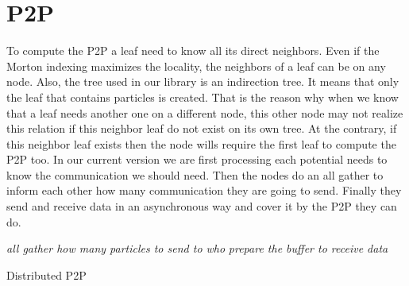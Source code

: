 \documentclass[12pt,letterpaper,titlepage]{report}
\begin{document}
\section{P2P}
To compute the P2P a leaf need to know all its direct neighbors.
Even if the Morton indexing maximizes the locality, the neighbors of a leaf can be on any node.
Also, the tree used in our library is an indirection tree.
It means that only the leaf that contains particles is created.
That is the reason why when we know that a leaf needs another one on a different node, this other node may not realize this relation if this neighbor leaf do not exist on its own tree.
At the contrary, if this neighbor leaf exists then the node wills require the first leaf to compute the P2P too.
In our current version we are first processing each potential needs to know the communication we should need.
Then the nodes do an all gather to inform each other how many communication they are going to send.
Finally they send and receive data in an asynchronous way and cover it by the P2P they can do.
\BlankLine
\begin{algorithm}[H]
\linesnumbered
\SetLine
{}
\BlankLine
{}
\emph{all gather how many particles to send to who}\;
\emph{prepare the buffer to receive data}\;
\BlankLine
\caption{Distributed P2P}
\end{algorithm}
\end{document}
